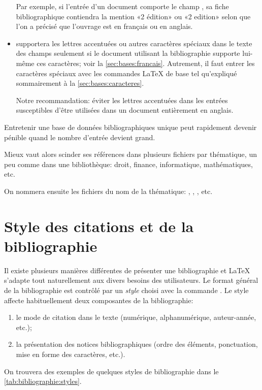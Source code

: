 \begin{itemize}
  Par exemple, si l'entrée d'un document comporte le champ
  , sa fiche bibliographique contiendra la mention
  «2{\ieme} édition» ou «2 edition» selon que l'on a précisé
  que l'ouvrage est en français ou en anglais.
\item {\BibTeX} supportera les lettres accentuées ou autres caractères
  spéciaux dans le texte des champs seulement si le document utilisant
  la bibliographie supporte lui-même ces caractères; voir la
  \autoref{sec:bases:francais}. Autrement, il faut entrer les
  caractères spéciaux avec les commandes {\LaTeX} de base tel
  qu'expliqué sommairement à la \autoref{sec:bases:caracteres}.

  Notre recommandation: éviter les lettres accentuées dans les
  entrées susceptibles d'être utilisées dans un document entièrement
  en anglais.
\end{itemize}

\begin{conseil}
  Entretenir une base de données bibliographiques unique peut
  rapidement devenir pénible quand le nombre d'entrée devient grand.

  Mieux vaut alors scinder ses références dans plusieurs fichiers par
  thématique, un peu comme dans une bibliothèque:
  droit, finance, informatique, mathématiques, etc.

  On nommera ensuite les fichiers du nom de la thématique:
  , ,
  , etc.
\end{conseil}



\section{Style des citations et de la bibliographie}
\label{sec:bibliographie:style}

Il existe plusieurs manières différentes de présenter une
bibliographie et {\LaTeX} s'adapte tout naturellement aux divers
besoins des utilisateurs. Le format général de la bibliographie est
contrôlé par un \emph{style} choisi avec la commande
\cmd{}. Le style affecte habituellement deux
composantes de la bibliographie:
\begin{enumerate}
\item le mode de citation dans le texte (numérique, alphanumérique,
  auteur-année, etc.);
\item la présentation des notices bibliographiques (ordre des
  éléments, ponctuation, mise en forme des caractères, etc.).
\end{enumerate}
On trouvera des exemples de quelques styles de bibliographie dans le
\autoref{tab:bibliographie:styles}.


